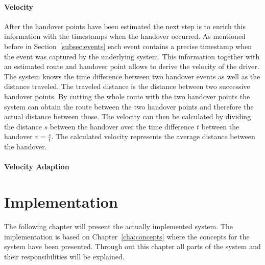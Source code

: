 \documentclass[master,english]{hgbthesis}
\begin{document}
\subsubsection{Velocity}
\label{sec:velocity}
After the handover points have been estimated the next step is to enrich this information with the timestamps when the handover occurred. As mentioned before in Section~\ref{subsec:events} each event contains a precise timestamp when the event was captured by the underlying system. This information together with an estimated route and handover point allows to derive the velocity of the driver. The system knows the time difference between two handover events as well as the distance traveled. The traveled distance is the distance between two successive handover points. By cutting the whole route with the two handover points the system can obtain the route between the two handover points and therefore the actual distance between those. The velocity can then be calculated  by dividing the distance $s$ between the handover over the time difference $t$ between the handover $v=\frac{s}{t}$. The calculated velocity represents the average distance between the handover.
\subsubsection{Velocity Adaption}
\label{sec:adaption}
\chapter{Implementation}
\label{cha:implementation}
The following chapter will present the actually implemented system. The implementation is based on Chapter~\ref{cha:concepts} where the concepts for the system have been presented. Through out this chapter all parts of the system and their responsibilities will be explained.  
\end{document}
